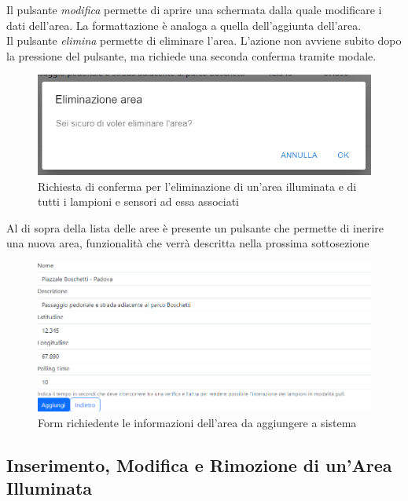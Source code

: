 \documentclass[a4paper, 12pt]{article}
\begin{document}
Il pulsante \textit{modifica} permette di aprire una schermata dalla quale modificare i dati dell'area. La formattazione è analoga a quella dell'aggiunta dell'area.\\
Il pulsante \textit{elimina} permette di eliminare l'area. L'azione non avviene subito dopo la pressione del pulsante, ma richiede una seconda conferma tramite modale. \\
\begin{figure}[H]
\centering
\includegraphics[width=\textwidth]{ModaleEliminazioneArea}
\caption{Richiesta di conferma per l'eliminazione di un'area illuminata e di tutti i lampioni e sensori ad essa associati}
\end{figure}

Al di sopra della lista delle aree è presente un pulsante che permette di inerire una nuova area, funzionalità che verrà descritta nella prossima sottosezione
\begin{figure}[H]
\centering
\includegraphics[width=\textwidth]{FormAggiuntaArea}
\caption{Form richiedente le informazioni dell'area da aggiungere a sistema}
\end{figure}

\subsection{Inserimento, Modifica e Rimozione di un'Area Illuminata}
\end{document}

